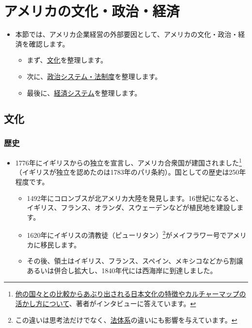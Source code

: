 \documentclass[
]{book}
\begin{document}
\hypertarget{us-external}{%
\section{アメリカの文化・政治・経済}\label{us-external}}

\begin{itemize}
\item
  本節では、アメリカ企業経営の外部要因として、アメリカの文化・政治・経済を確認します。

  \begin{itemize}
  \item
    まず、\protect\hyperlink{us-culture}{文化}を整理します。
  \item
    次に、\protect\hyperlink{us-politics}{政治システム・法制度}を整理します。
  \item
    最後に、\protect\hyperlink{us-economy}{経済システム}を整理します。
  \end{itemize}
\end{itemize}

\hypertarget{us-culture}{%
\subsection{文化}\label{us-culture}}

\hypertarget{ux6b74ux53f2}{%
\subsubsection{歴史}\label{ux6b74ux53f2}}

\begin{itemize}
\item
  1776年にイギリスからの独立を宣言し、アメリカ合衆国が建国されました\footnote{\href{https://plus.alc.co.jp/2018/01/meyer/}{他の国々との比較からあぶり出される日本文化の特徴やカルチャーマップの活かし方について}、著者がインタビューに答えています。}（イギリスが独立を認めたのは1783年のパリ条約）。国としての歴史は250年程度です。

  \begin{itemize}
  \item
    1492年にコロンブスが北アメリカ大陸を発見します。16世紀になると、イギリス、フランス、オランダ、スウェーデンなどが植民地を建設します。
  \item
    1620年にイギリスの清教徒（ピューリタン）\footnote{この違いは思考法だけでなく、\protect\hyperlink{law}{法体系}の違いにも影響を与えています。}がメイフラワー号でアメリカに移民します。
  \item
    その後、領土はイギリス、フランス、スペイン、メキシコなどから割譲あるいは併合し拡大し、1840年代には西海岸に到達しました。
  \end{itemize}
\end{itemize}
\end{document}
